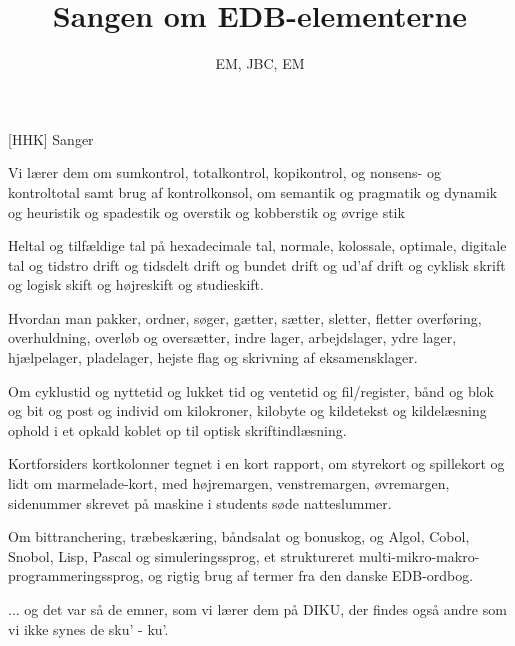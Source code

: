 \documentclass[a4paper,11pt]{article}
\title{Sangen om EDB-elementerne}
\author{EM, JBC, EM}
\begin{document}
\maketitle

\begin{roles}
  [HHK] Sanger
\end{roles}

\begin{song}
   Vi lærer dem om sumkontrol, totalkontrol, kopikontrol,
  og nonsens- og kontroltotal samt brug af kontrolkonsol,
  om semantik og pragmatik og dynamik og heuristik
  og spadestik og overstik og kobberstik og øvrige stik

  Heltal og tilfældige tal på hexadecimale tal,
  normale, kolossale, optimale, digitale tal
  og tidstro drift og tidsdelt drift og bundet drift og ud'af drift
  og cyklisk skrift og logisk skift og højreskift og studieskift.

  Hvordan man pakker, ordner, søger, gætter, sætter, sletter, fletter
  overføring, overhuldning, overløb og oversætter,
  indre lager, arbejdslager, ydre lager, hjælpelager,
  pladelager, hejste flag og skrivning af eksamensklager.


   Om cyklustid og nyttetid og lukket tid og ventetid
  og fil/register, bånd og blok og bit og post og individ
  om kilokroner, kilobyte og kildetekst og kildelæsning
  ophold i et opkald koblet op til optisk skriftindlæsning.

  Kortforsiders kortkolonner tegnet i en kort rapport,
  om styrekort og spillekort og lidt om marmelade-kort,
  med højremargen, venstremargen, øvremargen, sidenummer
  skrevet på maskine i students søde natteslummer.

  Om bittranchering, træbeskæring, båndsalat og bonuskog,
  og Algol, Cobol, Snobol, Lisp, Pascal og simuleringssprog,
  et struktureret multi-mikro-makro-programmeringssprog,
  og rigtig brug af termer fra den danske EDB-ordbog.

  ... og det var så de emner, som vi lærer dem på DIKU,
  der findes også andre som vi ikke synes de sku' - ku'.
\end{song}
\end{document}
